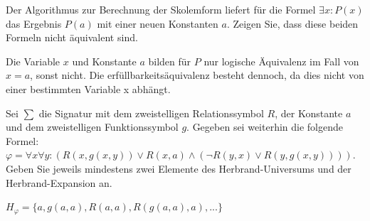 \documentclass[10pt, a4paper]{exam}
\begin{document}
\begin{questions}

    \question Der Algorithmus zur Berechnung der Skolemform liefert für die Formel $\exists x:P(x)$ das Ergebnis $P(a)$ mit einer neuen Konstanten $a$. Zeigen Sie, dass diese beiden Formeln nicht äquivalent sind.
    \begin{solution}
        Die Variable $x$ und Konstante $a$ bilden für $P$ nur logische Äquivalenz im Fall von $x=a$, sonst nicht. Die erfüllbarkeitsäquivalenz besteht dennoch, da dies nicht von einer bestimmten Variable x abhängt.
    \end{solution}

    \question Sei $\sum$ die Signatur mit dem zweistelligen Relationssymbol $R$, der Konstante $a$ und dem zweistelligen Funktionssymbol $g$. Gegeben sei weiterhin die folgende Formel:
    $\varphi=\forall x\forall y:(R(x,g(x,y))\vee R(x,a)\wedge(\lnot R(y,x)\vee R(y,g(x,y))))$.
    Geben Sie jeweils mindestens zwei Elemente des Herbrand-Universums und der Herbrand-Expansion an.
    \begin{solution}
        $H_{\varphi} = \{a, g(a,a), R(a,a), R(g(a,a),a), ...\}$


\end{solution}
\end{questions}
\end{document}
